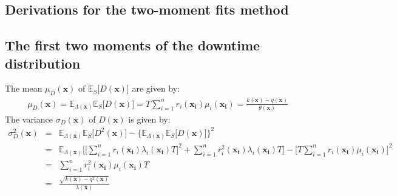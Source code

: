 \documentclass[preprint,12pt]{elsarticle}
\begin{document}
\begin{appendices}
\section{Derivations for the two-moment fits method}
\label{AG}
\subsection{The first two moments of the downtime distribution}
The mean $\mu_{D}(\boldsymbol{x})$ of $\mathbb{E}_{S}\bigg[D(\boldsymbol{x})\bigg]$ are given by:
\begin{eqnarray}
\mu_{D}(\boldsymbol{x})=\mathbb{E}_{\Lambda(\boldsymbol{x})}\mathbb{E}_{S} \bigg[D(\boldsymbol{x}) \bigg]=T\sum_{i=1}^{n}{r_{i}(\boldsymbol{x_i})\mu_{i}(\boldsymbol{x_i})}=\frac{k(\boldsymbol{x})-q(\boldsymbol{x})}{\theta(\boldsymbol{x})}
\label{muD}
\end{eqnarray}
The variance $\sigma_{D}(\boldsymbol{x})$ of $D(\boldsymbol{x})$ is given by:
\begin{eqnarray}
\sigma^{2}_{D}(\boldsymbol{x})&=&\mathbb{E}_{\Lambda(\boldsymbol{x})}\mathbb{E}_{S} \bigg[D^{2}(\boldsymbol{x}) \bigg]- \bigg\{\mathbb{E}_{\Lambda(\boldsymbol{x})}\mathbb{E}_{S}\bigg[D(\boldsymbol{x}) \bigg] \bigg\}^{2} \nonumber\\
&=& \mathbb{E}_{\Lambda(\boldsymbol{x})}\bigg[\bigg[\sum_{i=1}^{n}{r_{i}(\boldsymbol{x_{i}})\lambda_{i}(\boldsymbol{x_{i}})T}\bigg]^{2} +\sum_{i=1}^{n}{r_{i}^{2}(\boldsymbol{x_{i}})\lambda_{i}(\boldsymbol{x_{i}})T}\bigg]-\bigg[T\sum_{i=1}^{n}{r_{i}(\boldsymbol{x_i})\mu_{i}(\boldsymbol{x_i})}\bigg]^{2}\nonumber\\
&=&\sum_{i=1}^{n}{r_{i}^{2}(\boldsymbol{x_i})\mu_{i}(\boldsymbol{x_i})T}\nonumber\\
&=&\frac{\sqrt{k(\boldsymbol{x})-q^{2}(\boldsymbol{x})}}{\lambda(\boldsymbol{x})}
\end{eqnarray}

\end{appendices}
\end{document}
